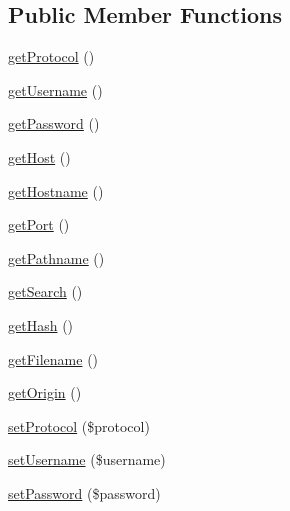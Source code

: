 \subsection*{Public Member Functions}
\begin{DoxyCompactItemize}
\item 
\hyperlink{class_able_polecat___access_control___resource___locater_ab2caee71cf780f7242c4a5c0261f2b97}{get\+Protocol} ()
\item 
\hyperlink{class_able_polecat___access_control___resource___locater_a81b37a3c9d639574e394f80c1138c75e}{get\+Username} ()
\item 
\hyperlink{class_able_polecat___access_control___resource___locater_a04e0957baeb7acde9c0c86556da2d43f}{get\+Password} ()
\item 
\hyperlink{class_able_polecat___access_control___resource___locater_a39895a44b52bdced039e698588aaf18e}{get\+Host} ()
\item 
\hyperlink{class_able_polecat___access_control___resource___locater_a62ab2489d5b573dbe83038815c00a283}{get\+Hostname} ()
\item 
\hyperlink{class_able_polecat___access_control___resource___locater_afd4db46d3c12f47f0bee19cd2101be64}{get\+Port} ()
\item 
\hyperlink{class_able_polecat___access_control___resource___locater_ac082a4f3ceaf69c24a60704c74a93cbf}{get\+Pathname} ()
\item 
\hyperlink{class_able_polecat___access_control___resource___locater_aba924be68eb0acbf989e9e68991b2a96}{get\+Search} ()
\item 
\hyperlink{class_able_polecat___access_control___resource___locater_a10220afb27800deb78f48b4698a74742}{get\+Hash} ()
\item 
\hyperlink{class_able_polecat___access_control___resource___locater_a2982abe8d7b767602a1485dfb4cf653d}{get\+Filename} ()
\item 
\hyperlink{class_able_polecat___access_control___resource___locater_ace359404a4a0a42d342fd96f2f3e1a3f}{get\+Origin} ()
\item 
\hyperlink{class_able_polecat___access_control___resource___locater_ae2238ca228e0bb56ca0ae233893c0b91}{set\+Protocol} (\$protocol)
\item 
\hyperlink{class_able_polecat___access_control___resource___locater_ac359b701a2ccaff746dd480f03314244}{set\+Username} (\$username)
\item 
\hyperlink{class_able_polecat___access_control___resource___locater_a3e35c8d3dbb2c513c618a664389e0926}{set\+Password} (\$password)

\end{DoxyCompactItemize}
